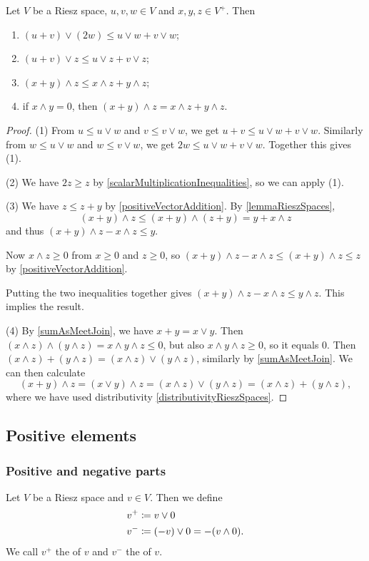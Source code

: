 \begin{proposition} \label{additionLatticeOperationsInequalities}
Let $V$ be a Riesz space, $u,v,w\in V$ and $x,y,z\in V^+$. Then
\begin{enumerate}
\item $(u+v)\vee (2w) \leq u\vee w + v\vee w$;
\item $(u+v)\vee z \leq u\vee z + v\vee z$;
\item $(x+y)\wedge z \leq x\wedge z + y\wedge z$;
\item if $x\wedge y = 0$, then $(x+y)\wedge z = x\wedge z + y\wedge z$.
\end{enumerate}
\end{proposition}
\begin{proof}
(1) From $u\leq u\vee w$ and $v\leq v\vee w$, we get $u+v \leq u\vee w + v\vee w$. Similarly from $w\leq u\vee w$ and $w\leq v\vee w$, we get $2w \leq u\vee w + v\vee w$. Together this gives (1).

(2) We have $2z \geq z$ by \ref{scalarMultiplicationInequalities}, so we can apply (1).

(3) We have $z \leq z+y$ by \ref{positiveVectorAddition}. By \ref{lemmaRieszSpaces},
\[ (x+y)\wedge z \leq (x+y)\wedge (z+y) = y + x\wedge z \]
and thus $(x+y)\wedge z - x\wedge z \leq y$. 

Now $x\wedge z \geq 0$ from $x\geq 0$ and $z\geq 0$, so $(x+y)\wedge z - x\wedge z \leq (x+y)\wedge z \leq z$ by \ref{positiveVectorAddition}.

Putting the two inequalities together gives $(x+y)\wedge z - x\wedge z \leq y\wedge z$. This implies the result.

(4) By \ref{sumAsMeetJoin}, we have $x+y = x\vee y$. Then $(x\wedge z)\wedge (y\wedge z) = x\wedge y \wedge z \leq 0$, but also $x\wedge y \wedge z \geq 0$, so it equals $0$. Then $(x\wedge z) + (y\wedge z) = (x\wedge z) \vee (y\wedge z)$, similarly by \ref{sumAsMeetJoin}. We can then calculate
\[ (x+y)\wedge z = (x\vee y)\wedge z = (x\wedge z)\vee (y\wedge z) = (x\wedge z) + (y\wedge z), \]
where we have used distributivity \ref{distributivityRieszSpaces}.
\end{proof}

\subsection{Positive elements}
\subsubsection{Positive and negative parts}
\begin{definition}
Let $V$ be a Riesz space and $v\in V$. Then we define
\begin{align*}
v^+ &\coloneqq v \vee 0 \\
v^- &\coloneqq (-v) \vee 0 = - (v \wedge 0).
\end{align*}
We call $v^+$ the  of $v$ and $v^-$ the  of $v$.
\end{definition}

